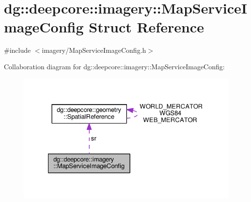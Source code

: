 \hypertarget{structdg_1_1deepcore_1_1imagery_1_1_map_service_image_config}{}\section{dg\+:\+:deepcore\+:\+:imagery\+:\+:Map\+Service\+Image\+Config Struct Reference}
\label{structdg_1_1deepcore_1_1imagery_1_1_map_service_image_config}


{\ttfamily \#include $<$imagery/\+Map\+Service\+Image\+Config.\+h$>$}



Collaboration diagram for dg\+:\+:deepcore\+:\+:imagery\+:\+:Map\+Service\+Image\+Config\+:
\nopagebreak
\begin{figure}[H]
\begin{center}
\leavevmode
\includegraphics[width=327pt]{structdg_1_1deepcore_1_1imagery_1_1_map_service_image_config__coll__graph}
\end{center}
\end{figure}
